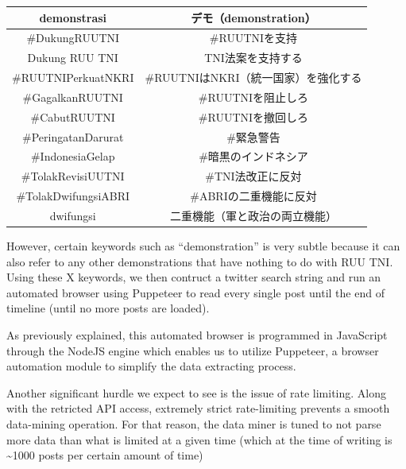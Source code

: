 \documentclass{jabstract}
\begin{document}
\begin{multicols}{2}
\begin{tablehere}
{{\begin{tabular}{|c|c|}
        demonstrasi & デモ（demonstration） \\
        \hline
        \#DukungRUUTNI & \#RUUTNIを支持 \\
        \hline
        Dukung RUU TNI & TNI法案を支持する \\
        \hline
        \#RUUTNIPerkuatNKRI & \#RUUTNIはNKRI（統一国家）を強化する \\
        \hline
        \#GagalkanRUUTNI & \#RUUTNIを阻止しろ \\
        \hline
        \#CabutRUUTNI & \#RUUTNIを撤回しろ \\
        \hline
        \#PeringatanDarurat & \#緊急警告 \\
        \hline
        \#IndonesiaGelap & \#暗黒のインドネシア \\
        \hline
        \#TolakRevisiUUTNI & \#TNI法改正に反対 \\
        \hline
        \#TolakDwifungsiABRI & \#ABRIの二重機能に反対 \\
        \hline
        dwifungsi & 二重機能（軍と政治の両立機能） \\
        \hline
      \end{tabular}
    }
  }%
\end{tablehere}
However, certain keywords such as ``demonstration'' is very subtle because it can also refer to any other demonstrations that have nothing to do with RUU TNI. Using these X keywords, we then contruct a twitter search string and run an automated browser using Puppeteer to read every single post until the end of timeline (until no more posts are loaded). 

As previously explained, this automated browser is programmed in JavaScript through the NodeJS engine which enables us to utilize Puppeteer, a browser automation module to simplify the data extracting process.

Another significant hurdle we expect to see is the issue of rate limiting. Along with the retricted API access, extremely strict rate-limiting prevents a smooth data-mining operation. For that reason, the data miner is tuned to not parse more data than what is limited at a given time (which at the time of writing is \textasciitilde1000 posts per certain amount of time)


\end{multicols}
\end{document}
